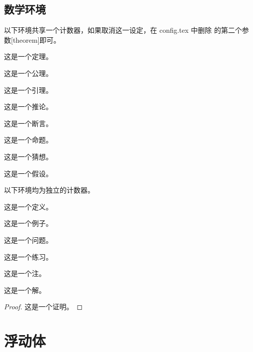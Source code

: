 \subsection{数学环境}
以下环境共享一个计数器，如果取消这一设定，在 config.tex 中删除  的第二个参数[theorem]即可。

\begin{theorem}      这是一个定理。 \end{theorem}
\begin{axiom}        这是一个公理。 \end{axiom}
\begin{lemma}        这是一个引理。 \end{lemma}
\begin{corollary}    这是一个推论。 \end{corollary}
\begin{assertion}    这是一个断言。 \end{assertion}
\begin{proposition}  这是一个命题。 \end{proposition}
\begin{conjecture}   这是一个猜想。 \end{conjecture}
\begin{assumption}   这是一个假设。 \end{assumption}

以下环境均为独立的计数器。

\begin{definition}   这是一个定义。 \end{definition}
\begin{example}      这是一个例子。 \end{example}
\begin{problem}      这是一个问题。 \end{problem}
\begin{exercise}     这是一个练习。 \end{exercise}
\begin{remark}       这是一个注。   \end{remark}
\begin{solution}     这是一个解。   \end{solution}
\begin{proof}        这是一个证明。 \end{proof}

\section{浮动体}

